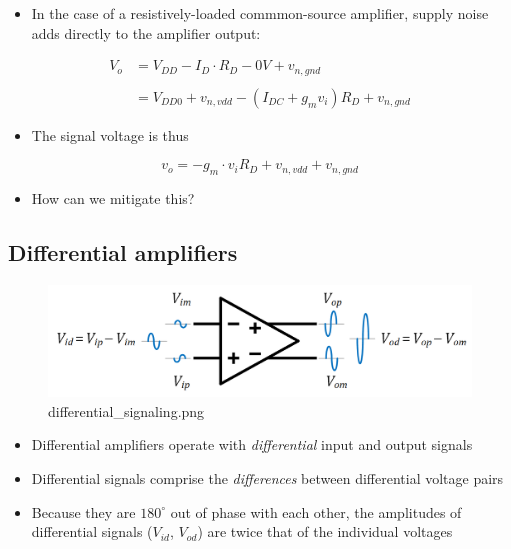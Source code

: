 \documentclass[11pt]{article}
\providecommand{\tightlist}{%
      \setlength{\itemsep}{0pt}\setlength{\parskip}{0pt}}
\begin{document}
    \begin{itemize}
\tightlist
\item
  In the case of a resistively-loaded commmon-source amplifier, supply
  noise adds directly to the amplifier output:
\end{itemize}

\begin{align}
V_{o} &= V_{DD} - I_D\cdot R_D - 0V + v_{n,gnd}\\
\\
&= V_{DD0} + v_{n,vdd} - (I_{DC} + g_m v_i)R_D + v_{n,gnd}
\end{align}

\begin{itemize}
\tightlist
\item
  The signal voltage is thus
\end{itemize}

\begin{equation}
v_o = -g_m\cdot v_i R_D + v_{n,vdd} + v_{n,gnd}
\end{equation}

\begin{itemize}
\tightlist
\item
  How can we mitigate this?
\end{itemize}

    \hypertarget{differential-amplifiers}{%
\subsection{Differential amplifiers}\label{differential-amplifiers}}

    \begin{figure}
\centering
\includegraphics{differential_signaling.png}
\caption{differential\_signaling.png}
\end{figure}

    \begin{itemize}
\tightlist
\item
  Differential amplifiers operate with \emph{differential} input and
  output signals
\item
  Differential signals comprise the \emph{differences} between
  differential voltage pairs
\item
  Because they are \(180^\circ\) out of phase with each other, the
  amplitudes of differential signals (\(V_{id}\), \(V_{od}\)) are twice
  that of the individual voltages
\end{itemize}
\end{document}
